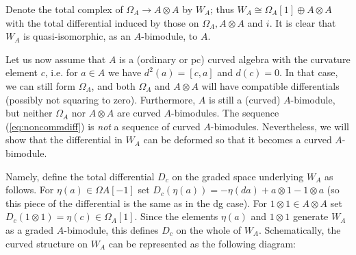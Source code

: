 \documentclass[a4paper]{amsart}
\theoremstyle{plain}
\theoremstyle{definition}
\theoremstyle{remark}
\numberwithin{equation}{section}
\theoremstyle{plain}
\begin{document}
Denote the total complex of $\Omega_A\to A\otimes A$ by $W_A$; thus $W_A\cong\Omega_A[1]\oplus A\otimes A$ with the total differential induced by those on $\Omega_A,A\otimes A$ and $i$. It is clear that $W_A$ is quasi-isomorphic, as an $A$-bimodule, to $A$.

Let us now assume that $A$ is a (ordinary or pc) curved algebra with the curvature element $c$, i.e. for $a\in A$ we have $d^2(a)=[c,a]$ and $d(c)=0$. In that case, we can still form $\Omega_A$, and both $\Omega_A$ and $A\otimes A$ will have compatible differentials (possibly not squaring to zero). Furthermore, $A$ is still a (curved) $A$-bimodule, but neither $\Omega_A$ nor $A\otimes A$ are curved $A$-bimodules. The sequence (\ref{eq:noncommdiff}) is \emph{not} a sequence of curved $A$-bimodules. Nevertheless, we will show that the differential in $W_A$ can be deformed so that it becomes a curved $A$-bimodule.

Namely, define the total differential $D_c$ on the graded space underlying $W_A$ as follows. For $\eta(a)\in\Omega A[-1]$ set $D_c(\eta(a))=-\eta(da)+a\otimes1-1\otimes a$ (so this piece of the differential is the same as in the dg case). For $1\otimes 1\in A\otimes A$ set $D_c(1\otimes 1)=\eta(c)\in\Omega_A[1]$. Since the elements $\eta(a)$ and $1\otimes 1$ generate $W_A$ as a graded $A$-bimodule, this defines $D_c$ on the whole of $W_A$. Schematically, the curved structure on $W_A$ can be represented as the following diagram:
\end{document}
